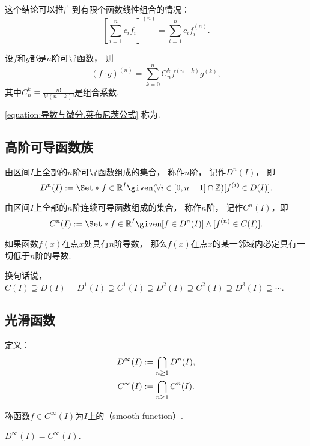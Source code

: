 这个结论可以推广到有限个函数线性组合的情况：\begin{equation}
	\left[ \sum_{i=1}^n c_i f_i \right]^{(n)}
	= \sum_{i=1}^n c_i f_i^{(n)}.
\end{equation}

\begin{theorem}
设\(f\)和\(g\)都是\(n\)阶可导函数，
则\begin{equation}\label{equation:导数与微分.莱布尼茨公式}
	(f \cdot g)^{(n)}
	= \sum_{k=0}^n C_n^k f^{(n-k)} g^{(k)},
\end{equation}
其中\(C_n^k \equiv \frac{n!}{k! (n-k)!}\)是组合系数.
\end{theorem}
\cref{equation:导数与微分.莱布尼茨公式} 称为.

\subsection{高阶可导函数族}
\begin{definition}\label{definition:函数族.n阶可导函数族}
由区间\(I\)上全部的\(n\)阶可导函数组成的集合，
称作\(n\)阶，
记作\(D^n(I)\)，
即\[
	D^n(I)
	\defeq
	\Set*{
		f\in\mathbb{R}^I
		\given
		(\forall i\in[0,n-1]\cap\mathbb{Z})
		[f^{(i)} \in D(I)]
	}.
\]
\end{definition}

\begin{definition}\label{definition:函数族.n阶连续可导函数族}
由区间\(I\)上全部的\(n\)阶连续可导函数组成的集合，
称作\(n\)阶，
记作\(C^n(I)\)，即\[
	C^n(I)
	\defeq
	\Set*{
		f\in\mathbb{R}^I
		\given
		[f\in D^n(I)]
		\land
		[f^{(n)}\in C(I)]
	}.
\]
\end{definition}

\begin{theorem}
如果函数\(f(x)\)在点\(x\)处具有\(n\)阶导数，
那么\(f(x)\)在点\(x\)的某一邻域内必定具有一切低于\(n\)阶的导数.
\end{theorem}
换句话说，\(C(I) \supseteq
D(I) = D^1(I) \supseteq
C^1(I) \supseteq
D^2(I) \supseteq
C^2(I) \supseteq
D^3(I) \supseteq
\dotsb\).

\subsection{光滑函数}
\begin{definition}\label{definition:函数族.光滑函数族}
定义：\begin{gather*}
	D^\infty (I) := \bigcap_{n\geq1} D^n(I), \\
	C^\infty (I) := \bigcap_{n\geq1} C^n(I).
\end{gather*}

称函数\(f \in C^\infty (I)\)为\(I\)上的（smooth function）.
\end{definition}

\begin{property}\label{theorem:函数族.光滑函数族的性质1}
\(D^\infty (I) = C^\infty (I)\).
\end{property}
